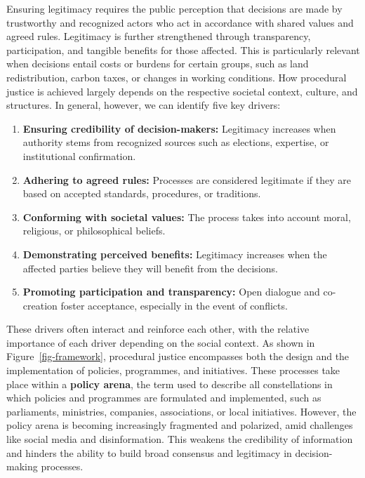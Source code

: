 \documentclass[
  a4paper,
  openany]{book}
\begin{document}
Ensuring legitimacy requires the public perception that decisions are
made by trustworthy and recognized actors who act in accordance with
shared values and agreed rules. Legitimacy is further strengthened
through transparency, participation, and tangible benefits for those
affected. This is particularly relevant when decisions entail costs or
burdens for certain groups, such as land redistribution, carbon taxes,
or changes in working conditions. How procedural justice is achieved
largely depends on the respective societal context, culture, and
structures. In general, however, we can identify five key drivers:

\begin{enumerate}
\def\labelenumi{\arabic{enumi}.}
\item
  \textbf{Ensuring credibility of decision-makers:} Legitimacy increases
  when authority stems from recognized sources such as elections,
  expertise, or institutional confirmation.
\item
  \textbf{Adhering to agreed rules:} Processes are considered legitimate
  if they are based on accepted standards, procedures, or traditions.
\item
  \textbf{Conforming with societal values:} The process takes into
  account moral, religious, or philosophical beliefs.
\item
  \textbf{Demonstrating perceived benefits:} Legitimacy increases when
  the affected parties believe they will benefit from the decisions.
\item
  \textbf{Promoting participation and transparency:} Open dialogue and
  co-creation foster acceptance, especially in the event of conflicts.
\end{enumerate}

These drivers often interact and reinforce each other, with the relative
importance of each driver depending on the social context. As shown in
Figure~\ref{fig-framework}, procedural justice encompasses both the
design and the implementation of policies, programmes, and initiatives.
These processes take place within a \textbf{policy arena}, the term used
to describe all constellations in which policies and programmes are
formulated and implemented, such as parliaments, ministries, companies,
associations, or local initiatives. However, the policy arena is
becoming increasingly fragmented and polarized, amid challenges like
social media and disinformation. This weakens the credibility of
information and hinders the ability to build broad consensus and
legitimacy in decision-making processes.
\end{document}
